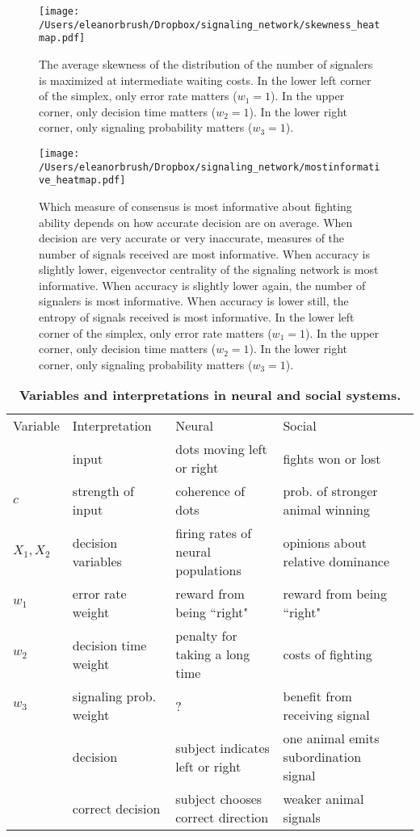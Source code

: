 \documentclass{article}
\newcommand{\ra}[1]{\renewcommand{\arraystretch}{#1}}
\begin{document}
\begin{figure}[ht]
\texttt{[image: /Users/eleanorbrush/Dropbox/signaling\_network/skewness\_heatmap.pdf]}
\caption{\label{skewness} The average skewness of the distribution of the number of signalers is maximized at intermediate waiting costs. In the lower left corner of the simplex, only error rate matters ($w_1=1$).  In the upper corner, only decision time matters ($w_2=1$).  In the lower right corner, only signaling probability matters ($w_3=1$).}
\end{figure}

\begin{figure}[ht]
\texttt{[image: /Users/eleanorbrush/Dropbox/signaling\_network/mostinformative\_heatmap.pdf]}
\caption{\label{bestmetric}  Which measure of consensus is most informative about fighting ability depends on how accurate decision are on average.  When decision are very accurate or very inaccurate, measures of the number of signals received are most informative.  When accuracy is slightly lower, eigenvector centrality of the signaling network is most informative.  When accuracy is slightly lower again, the number of signalers is most informative.  When accuracy is lower still, the entropy of signals received is most informative.  In the lower left corner of the simplex, only error rate matters ($w_1=1$).  In the upper corner, only decision time matters ($w_2=1$).  In the lower right corner, only signaling probability matters ($w_3=1$).}
\end{figure}

\begin{table}[ht]
\centering
\caption{\label{variables}{\bf  Variables and interpretations in neural and social systems.} }
\ra{1.3}
\begin{tabular}{@{}lllll@{}}
Variable & Interpretation & Neural &   Social \\
\cmidrule{1-4} 
& input & dots moving left or right & fights won or lost
\\$c$ & strength of input & coherence of dots & prob. of stronger animal winning
\\$X_1,X_2$ & decision variables &  firing rates of neural populations & opinions about relative dominance
\\ $w_1$ & error rate weight & reward from being ``right" & reward from being ``right"
\\ $w_2$ & decision time weight & penalty for taking a long time & costs of fighting
\\ $w_3$ & signaling prob. weight & ? & benefit from receiving signal
\\ & decision & subject indicates left or right & one animal emits subordination signal
\\ & correct decision & subject chooses correct direction & weaker animal signals
\end{tabular}
\end{table}
\end{document}
